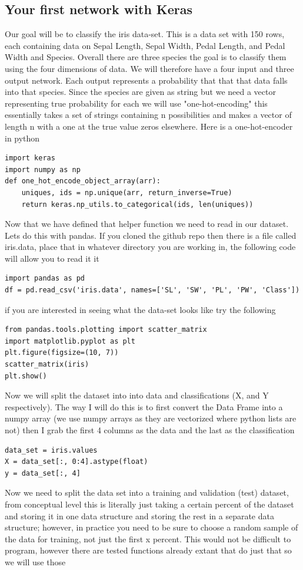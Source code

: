 \documentclass[a4paper]{article}
\begin{document}
\subsection{Your first network with Keras}
Our goal will be to classify the iris data-set. This is a data set with 150 rows, each containing data on Sepal Length, Sepal Width, Pedal Length, and Pedal Width and Species. Overall there are three species the goal is to classify them using the four dimensions of data. We will therefore have a four input and three output network. Each output represents a probability that that that data falls into that species. Since the species are given as string but we need a vector representing true probability for each we will use "one-hot-encoding" this essentially takes a set of strings containing n possibilities and makes a vector of length n with a one at the true value zeros elsewhere. Here is a one-hot-encoder in python
\begin{verbatim}
import keras
import numpy as np
def one_hot_encode_object_array(arr):
    uniques, ids = np.unique(arr, return_inverse=True)
    return keras.np_utils.to_categorical(ids, len(uniques))
\end{verbatim}
Now that we have defined that helper function we need to read in our dataset. Lets do this with pandas. If you cloned the github repo then there is a file called iris.data, place that in whatever directory you are working in, the following code will allow you to read it it
\begin{verbatim}
import pandas as pd
df = pd.read_csv('iris.data', names=['SL', 'SW', 'PL', 'PW', 'Class'])
\end{verbatim}
if you are interested in seeing what the data-set looks like try the following
\begin{verbatim}
from pandas.tools.plotting import scatter_matrix
import matplotlib.pyplot as plt
plt.figure(figsize=(10, 7))
scatter_matrix(iris)
plt.show()
\end{verbatim}
Now we will split the dataset into into data and classifications (X, and Y respectively). The way I will do this is to first convert the Data Frame into a numpy array (we use numpy arrays as they are vectorized where python lists are not) then I grab the first 4 columns as the data and the last as the classification 
\begin{verbatim}
data_set = iris.values
X = data_set[:, 0:4].astype(float)
y = data_set[:, 4]
\end{verbatim}
Now we need to split the data set into a training and validation (test) dataset, from conceptual level this is literally just taking a certain percent of the dataset and storing it in one data structure and storing the rest in a separate data structure; however, in practice you need to be sure to choose a random sample of the data for training, not just the first x percent. This would not be difficult to program, however there are tested functions already extant that do just that so we will use those
\end{document}
